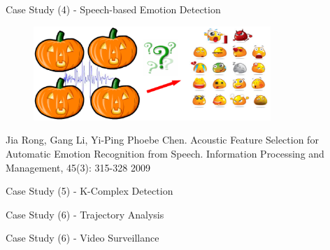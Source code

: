 \documentclass[
 size=14pt,
 paper=smartboard,  %
 mode=present, 		%
 display=slides, 	%
 style=tuliplab,  	%
 pauseslide,
 fleqn,leqno]{powerdot}
\begin{document}
\begin{slide}[toc=,bm=]{Case Study (4) - Speech-based Emotion Detection}

\begin{figure}
  \includegraphics[width=0.8\textwidth]{figures//theme1//Theme1_22.eps}
\end{figure}

\begin{thebibliography}{}
\bibitem{}
\small{Jia Rong, Gang Li, Yi-Ping Phoebe Chen.
Acoustic Feature Selection for Automatic Emotion Recognition from Speech.
Information Processing and Management, 45(3):  315-328 2009}
\end{thebibliography}

\end{slide}


\begin{slide}[toc=,bm=]{Case Study (5) - K-Complex Detection}



\end{slide}


\begin{slide}[toc=,bm=]{Case Study (6) - Trajectory Analysis}


\end{slide}


\begin{slide}[toc=,bm=]{Case Study (6) - Video Surveillance}
\begin{figure}[ht]
\end{figure}

\end{slide}
\end{document}
